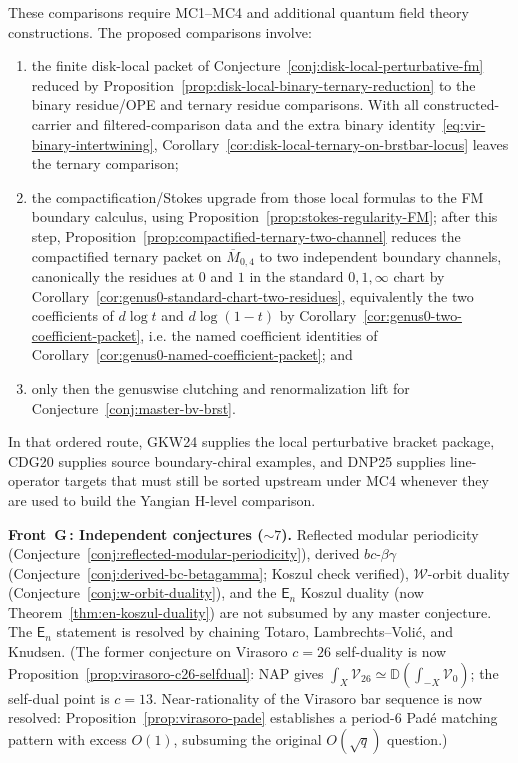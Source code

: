 \begin{remark}
These comparisons require MC1--MC4 and additional quantum field theory
constructions.  The proposed comparisons involve:
\begin{enumerate}[label=\textup{(\roman*)},nosep]
\item the finite disk-local packet of
  Conjecture~\ref{conj:disk-local-perturbative-fm}
  reduced by
  Proposition~\ref{prop:disk-local-binary-ternary-reduction}
  to the binary residue/OPE and ternary residue comparisons. With all constructed-carrier and filtered-comparison data and the extra binary identity~\eqref{eq:vir-binary-intertwining}, Corollary~\ref{cor:disk-local-ternary-on-brstbar-locus} leaves the ternary comparison;
\item the compactification/Stokes upgrade from those local formulas to
  the FM boundary calculus, using
  Proposition~\ref{prop:stokes-regularity-FM}; after this step,
  Proposition~\ref{prop:compactified-ternary-two-channel} reduces the
  compactified ternary packet on $\overline{M}_{0,4}$ to two
  independent boundary channels, canonically the residues at $0$ and
  $1$ in the standard $0,1,\infty$ chart by
  Corollary~\ref{cor:genus0-standard-chart-two-residues}, equivalently
  the two coefficients of $d\log t$ and $d\log(1-t)$ by
  Corollary~\ref{cor:genus0-two-coefficient-packet}, i.e. the named
  coefficient identities of
  Corollary~\ref{cor:genus0-named-coefficient-packet}; and
\item only then the genuswise clutching and renormalization lift for
  Conjecture~\ref{conj:master-bv-brst}.
\end{enumerate}
In that ordered route, GKW24 supplies the local perturbative bracket
package, CDG20 supplies source boundary-chiral examples, and DNP25
supplies line-operator targets that must still be sorted upstream under
MC4 whenever they are used to build the Yangian H-level comparison.

\smallskip\noindent
\textbf{Front~G\,: Independent conjectures \textup{(}${\sim}7$\textup{)}.}
Reflected modular periodicity
\textup{(}Conjecture~\ref{conj:reflected-modular-periodicity}\textup{)},
derived $bc$-$\beta\gamma$
\textup{(}Conjecture~\ref{conj:derived-bc-betagamma}; Koszul check
verified\textup{)},
$\mathcal{W}$-orbit duality
\textup{(}Conjecture~\ref{conj:w-orbit-duality}\textup{)},
and the $\mathsf{E}_n$ Koszul duality
\textup{(}now Theorem~\ref{thm:en-koszul-duality}\textup{)} are not subsumed
by any master conjecture.  The $\mathsf{E}_n$ statement is resolved by
chaining Totaro, Lambrechts--Voli\'c, and Knudsen.
\textup{(}The former conjecture on Virasoro $c = 26$ self-duality is
now Proposition~\ref{prop:virasoro-c26-selfdual}: NAP gives
$\int_X \mathcal{V}_{26} \simeq \mathbb{D}(\int_{-X}\mathcal{V}_0)$;
the self-dual point is $c = 13$.  Near-rationality of the Virasoro bar sequence is now resolved:
Proposition~\ref{prop:virasoro-pade} establishes a period-$6$
Pad\'e matching pattern with excess $O(1)$, subsuming the original
$O(\sqrt{q})$ question.\textup{)}
\end{remark}

